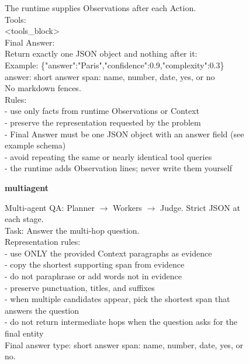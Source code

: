 \begin{figure}[p]
\begin{tcolorbox}
{  The runtime supplies Observations after each Action.\\
  Tools:\\
  <tools\_block>\\
  Final Answer:\\
  Return exactly one JSON object and nothing after it:\\
  Example: \{"answer":"Paris","confidence":0.9,"complexity":0.3\}\\
  answer: short answer span: name, number, date, yes, or no\\
  No markdown fences.\\
  Rules:\\
  - use only facts from runtime Observations or Context\\
  - preserve the representation requested by the problem\\
  - Final Answer must be one JSON object with an answer field (see example schema)\\
  - avoid repeating the same or nearly identical tool queries\\
  - the runtime adds Observation lines; never write them yourself\par}

  \vspace{6pt}
  \textbf{multiagent}\par\vspace{3pt}
  {\ttfamily\RaggedRight
  Multi-agent QA: Planner $\rightarrow$ Workers $\rightarrow$ Judge. Strict JSON at each stage.\\
  Task: Answer the multi-hop question.\\
  Representation rules:\\
  - use ONLY the provided Context paragraphs as evidence\\
  - copy the shortest supporting span from evidence\\
  - do not paraphrase or add words not in evidence\\
  - preserve punctuation, titles, and suffixes\\
  - when multiple candidates appear, pick the shortest span that answers the question\\
  - do not return intermediate hops when the question asks for the final entity\\
  Final answer type: short answer span: name, number, date, yes, or no.\par}


\end{tcolorbox}
\end{figure}
